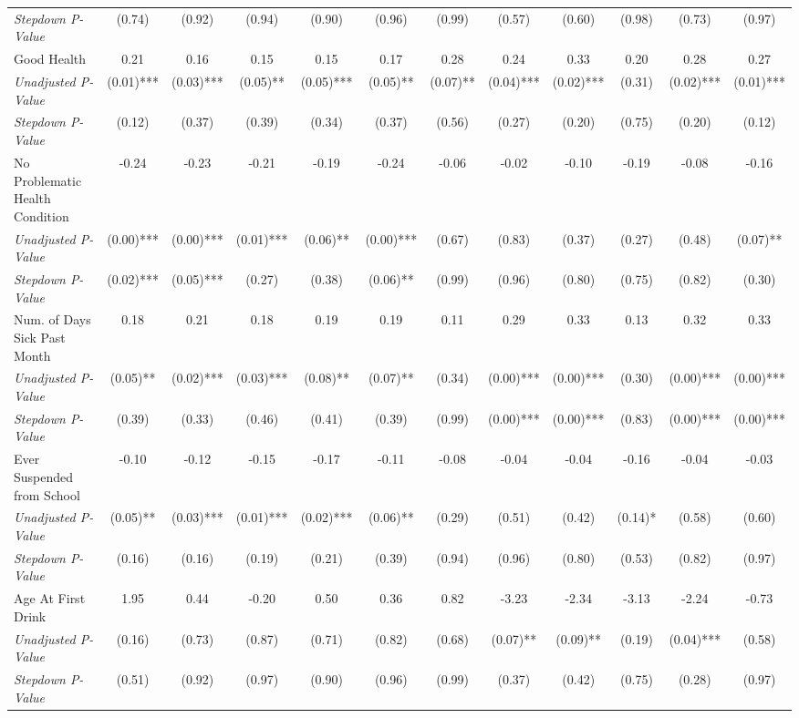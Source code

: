 \begin{tabular}{l c c c c c c c c c c c}
\quad \textit{Stepdown P-Value} & (0.74) & (0.92) & (0.94) & (0.90) & (0.96) & (0.99) & (0.57) & (0.60) & (0.98) & (0.73) & (0.97) \\
Good Health & 0.21 & 0.16 & 0.15 & 0.15 & 0.17 & 0.28 & 0.24 & 0.33 & 0.20 & 0.28 & 0.27 \\
\quad \textit{Unadjusted P-Value} & (0.01)*** & (0.03)*** & (0.05)** & (0.05)*** & (0.05)** & (0.07)** & (0.04)*** & (0.02)*** & (0.31) & (0.02)*** & (0.01)*** \\
\quad \textit{Stepdown P-Value} & (0.12) & (0.37) & (0.39) & (0.34) & (0.37) & (0.56) & (0.27) & (0.20) & (0.75) & (0.20) & (0.12) \\
No Problematic Health Condition & -0.24 & -0.23 & -0.21 & -0.19 & -0.24 & -0.06 & -0.02 & -0.10 & -0.19 & -0.08 & -0.16 \\
\quad \textit{Unadjusted P-Value} & (0.00)*** & (0.00)*** & (0.01)*** & (0.06)** & (0.00)*** & (0.67) & (0.83) & (0.37) & (0.27) & (0.48) & (0.07)** \\
\quad \textit{Stepdown P-Value} & (0.02)*** & (0.05)*** & (0.27) & (0.38) & (0.06)** & (0.99) & (0.96) & (0.80) & (0.75) & (0.82) & (0.30) \\
Num. of Days Sick Past Month & 0.18 & 0.21 & 0.18 & 0.19 & 0.19 & 0.11 & 0.29 & 0.33 & 0.13 & 0.32 & 0.33 \\
\quad \textit{Unadjusted P-Value} & (0.05)** & (0.02)*** & (0.03)*** & (0.08)** & (0.07)** & (0.34) & (0.00)*** & (0.00)*** & (0.30) & (0.00)*** & (0.00)*** \\
\quad \textit{Stepdown P-Value} & (0.39) & (0.33) & (0.46) & (0.41) & (0.39) & (0.99) & (0.00)*** & (0.00)*** & (0.83) & (0.00)*** & (0.00)*** \\
Ever Suspended from School & -0.10 & -0.12 & -0.15 & -0.17 & -0.11 & -0.08 & -0.04 & -0.04 & -0.16 & -0.04 & -0.03 \\
\quad \textit{Unadjusted P-Value} & (0.05)** & (0.03)*** & (0.01)*** & (0.02)*** & (0.06)** & (0.29) & (0.51) & (0.42) & (0.14)* & (0.58) & (0.60) \\
\quad \textit{Stepdown P-Value} & (0.16) & (0.16) & (0.19) & (0.21) & (0.39) & (0.94) & (0.96) & (0.80) & (0.53) & (0.82) & (0.97) \\
Age At First Drink & 1.95 & 0.44 & -0.20 & 0.50 & 0.36 & 0.82 & -3.23 & -2.34 & -3.13 & -2.24 & -0.73 \\
\quad \textit{Unadjusted P-Value} & (0.16) & (0.73) & (0.87) & (0.71) & (0.82) & (0.68) & (0.07)** & (0.09)** & (0.19) & (0.04)*** & (0.58) \\
\quad \textit{Stepdown P-Value} & (0.51) & (0.92) & (0.97) & (0.90) & (0.96) & (0.99) & (0.37) & (0.42) & (0.75) & (0.28) & (0.97) \\
\bottomrule
\end{tabular}
